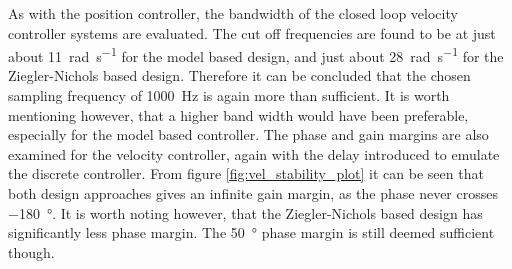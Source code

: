 \documentclass[../../main.tex]{subfiles}
\begin{document}
As with the position controller, the bandwidth of the closed loop velocity controller systems are evaluated. The cut off frequencies are found to be at just about \SI{11}{\radian \per \second} for the model based design, and just about \SI{28}{\radian \per \second} for the Ziegler-Nichols based design. Therefore it can be concluded that the chosen sampling frequency of \SI{1000}{\hertz} is again more than sufficient. It is worth mentioning however, that a higher band width would have been preferable, especially for the model based controller. 
The phase and gain margins are also examined for the velocity controller, again with the delay introduced to emulate the discrete controller. 
From figure \ref{fig:vel_stability_plot} it can be seen that both design approaches gives an infinite gain margin, as the phase never crosses \SI{-180}{\degree}. It is worth noting however, that the Ziegler-Nichols based design has significantly less phase margin. The \SI{50}{\degree} phase margin is still deemed sufficient though.

\end{document}
